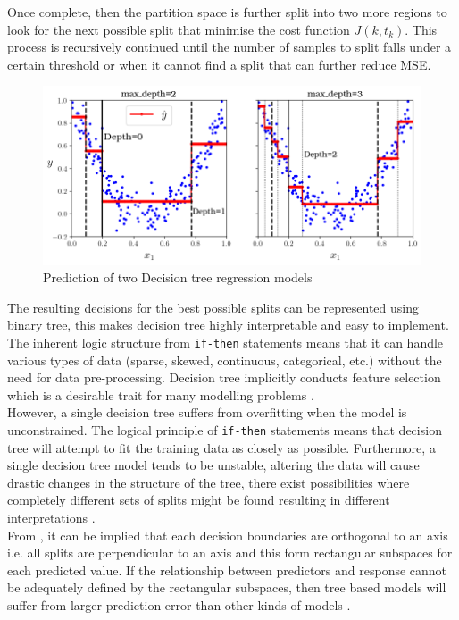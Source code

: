 Once complete, then the partition space is further split into two more regions to look for the next possible split that minimise the cost function $J(k,t_k)$. This process is recursively continued until the number of samples to split falls under a certain threshold or when it cannot find a split that can further reduce MSE.\\ 


\begin{figure}[h]
    \centering
    \includegraphics[width=.9\textwidth]{02_figures/fig6_5_partspace_geron09.png}
    \caption{Prediction of two Decision tree regression models }
    \label{fig:geron6_5}
\end{figure}

The resulting decisions for the best possible splits can be represented using binary tree, this makes decision tree highly interpretable and easy to implement. The inherent logic structure from {\tt if-then} statements means that it can handle various types of data (sparse, skewed, continuous, categorical, etc.) without the need for data pre-processing. Decision tree implicitly conducts feature selection which is a desirable trait for many modelling problems .\\

However, a single decision tree suffers from overfitting when the model is unconstrained. The logical principle of {\tt if-then} statements means that decision tree will attempt to fit the training data as closely as possible. Furthermore, a single decision tree model tends to be unstable, altering the data will cause drastic changes in the structure of the tree, there exist possibilities where completely different sets of splits might be found resulting in different interpretations .\\

From , it can be implied that each decision boundaries are orthogonal to an axis i.e. all splits are perpendicular to an axis and this form rectangular subspaces for each predicted value. If the relationship between predictors and response cannot be adequately defined by the rectangular subspaces, then tree based models will suffer from larger prediction error than other kinds of models .\\

